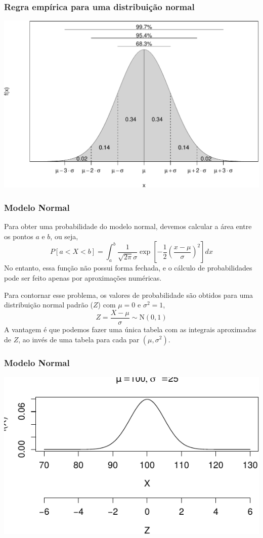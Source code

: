 \documentclass[11pt]{beamer}
\begin{document}
\begin{frame}
\frametitle{Regra empírica para uma distribuição normal}

\begin{center}\includegraphics[width=0.9\linewidth]{figs/empnorm-1} \end{center}
\end{frame}

\begin{frame}
\frametitle{Modelo Normal}

Para obter uma probabilidade do modelo normal, devemos calcular a área
entre os pontos \(a\) e \(b\), ou seja, \[
P[a < X < b] = \int_a^b \frac{1}{\sqrt{2\pi}\sigma} \exp\left[-\frac{1}{2}
\left( \frac{x - \mu}{\sigma}\right)^2\right] dx
\] No entanto, essa função não possui forma fechada, e o cálculo de
probabilidades pode ser feito apenas por aproximações numéricas.

Para contornar esse problema, os valores de probabilidade são obtidos
para uma distribuição normal padrão (\(Z\)) com \(\mu = 0\) e
\(\sigma^2 = 1\), \[
Z = \frac{X - \mu}{\sigma} \sim \text{N}(0,1)
\] A vantagem é que podemos fazer uma única tabela com as integrais
aproximadas de \(Z\), ao invés de uma tabela para cada par
\((\mu,\sigma^2)\).
\end{frame}

\begin{frame}
\frametitle{Modelo Normal}

\begin{center}\includegraphics[width=0.8\linewidth]{figs/unnamed-chunk_6_1} \end{center}
\end{frame}
\end{document}

